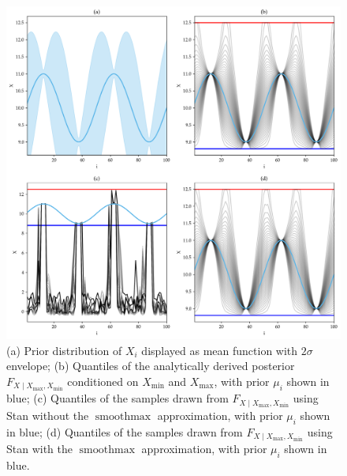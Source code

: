 \documentclass[letter]{article}
\makeatletter
\def\maxwidth{\ifdim\Gin@nat@width>\linewidth\linewidth
\else\Gin@nat@width\fi}
\let\Oldincludegraphics\includegraphics
\renewcommand{\includegraphics}[1]{\Oldincludegraphics[width=.8\maxwidth]{#1}}
\DeclareMathOperator*{\softmax}{smoothmax}
\newcommand{\Xmax}{X_{\max}}
\newcommand{\Xmin}{X_{\min}}
\newcommand{\Fcond}{F_{X \mid \Xmax,\Xmin}}
\makeatother
\begin{document}
        \begin{figure}
\centering
\includegraphics{../figures/toy_quantiles.png}
\caption{\label{fig:toy_quantiles}(a) Prior distribution of \(X_i\) displayed as mean function with \(2\sigma\) envelope; (b) Quantiles of the analytically derived posterior \(\Fcond\) conditioned on \(\Xmin\) and \(\Xmax\), with prior \(\mu_i\) shown in blue; (c) Quantiles of the samples drawn from \(\Fcond\) using Stan without the \(\softmax\) approximation, with prior \(\mu_i\) shown in blue; (d) Quantiles of the samples drawn from \(\Fcond\) using Stan with the \(\softmax\) approximation, with prior \(\mu_i\) shown in blue.}
\end{figure}
\end{document}
